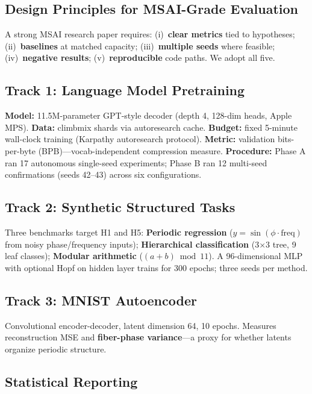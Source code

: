 \documentclass[11pt,twocolumn]{article}
\begin{document}
\subsection{Design Principles for MSAI-Grade Evaluation}

A strong MSAI research paper requires: (i)~\textbf{clear metrics} tied to hypotheses; (ii)~\textbf{baselines} at matched capacity; (iii)~\textbf{multiple seeds} where feasible; (iv)~\textbf{negative results}; (v)~\textbf{reproducible} code paths. We adopt all five.

\subsection{Track 1: Language Model Pretraining}

\textbf{Model:} 11.5M-parameter GPT-style decoder (depth 4, 128-dim heads, Apple MPS). \textbf{Data:} climbmix shards via autoresearch cache. \textbf{Budget:} fixed 5-minute wall-clock training (Karpathy autoresearch protocol). \textbf{Metric:} validation bits-per-byte (BPB)---vocab-independent compression measure. \textbf{Procedure:} Phase A ran 17 autonomous single-seed experiments; Phase B ran 12 multi-seed confirmations (seeds 42--43) across six configurations.

\subsection{Track 2: Synthetic Structured Tasks}

Three benchmarks target H1 and H5: \textbf{Periodic regression} ($y=\sin(\phi\cdot\mathrm{freq})$ from noisy phase/frequency inputs); \textbf{Hierarchical classification} (3$\times$3 tree, 9 leaf classes); \textbf{Modular arithmetic} ($(a+b)\bmod 11$). A 96-dimensional MLP with optional Hopf on hidden layer trains for 300 epochs; three seeds per method.

\subsection{Track 3: MNIST Autoencoder}

Convolutional encoder-decoder, latent dimension 64, 10 epochs. Measures reconstruction MSE and \textbf{fiber-phase variance}---a proxy for whether latents organize periodic structure.

\subsection{Statistical Reporting}
\end{document}
